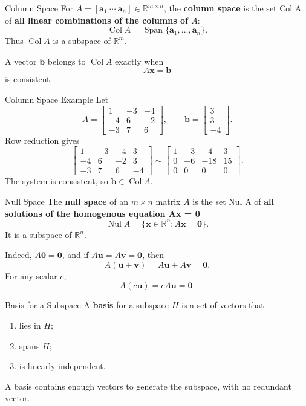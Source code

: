 \documentclass[aspectratio=169]{beamer}
\newcommand{\R}{\mathbb{R}}
\newcommand{\vect}[1]{\mathbf{#1}}
\newcommand{\Col}{\operatorname{Col}}
\newcommand{\Nul}{\operatorname{Nul}}
\newcommand{\Span}{\operatorname{Span}}
\begin{document}
\begin{frame}{Column Space}
For $A=[\vect a_1\ \cdots\ \vect a_n]\in\R^{m\times n}$, the \textbf{column space} is the set Col A of \textbf{all linear combinations of the columns of $A$}:
\[
\Col A=\Span\{\vect a_1,\ldots,\vect a_n\}.
\]
Thus $\Col A$ is a subspace of $\R^m$.
\pause

A vector $\vect b$ belongs to $\Col A$ exactly when
\[
A\vect x=\vect b
\]
is consistent.
\end{frame}

\begin{frame}{Column Space Example}
Let
\[
A=\begin{bmatrix}1&-3&-4\\-4&6&-2\\-3&7&6\end{bmatrix},
\qquad
\vect b=\begin{bmatrix}3\\3\\-4\end{bmatrix}.
\]
Row reduction gives
\[
\left[\begin{array}{ccc|c}
1&-3&-4&3\\-4&6&-2&3\\-3&7&6&-4
\end{array}\right]
\sim
\left[\begin{array}{ccc|c}
1&-3&-4&3\\0&-6&-18&15\\0&0&0&0
\end{array}\right].
\]
The system is consistent, so $\boxed{\vect b\in\Col A}$.
\end{frame}

\begin{frame}{Null Space}
The \textbf{null space} of an $m\times n$ matrix $A$ is the set Nul A of \textbf{all solutions of the homogenous equation Ax = 0}
\[
\Nul A=\{\vect x\in\R^n:A\vect x=\vect0\}.
\]
It is a subspace of $\R^n$.
\pause

Indeed, $A\vect0=\vect0$, and if $A\vect u=A\vect v=\vect0$, then
\[
A(\vect u+\vect v)=A\vect u+A\vect v=\vect0.
\]
For any scalar $c$,
\[
A(c\vect u)=cA\vect u=\vect0.
\]
\end{frame}

\begin{frame}{Basis for a Subspace}
A \textbf{basis} for a subspace $H$ is a set of vectors that
\begin{enumerate}
  \item lies in $H$;
  \item spans $H$;
  \item is linearly independent.
\end{enumerate}
\pause

A basis contains enough vectors to generate the subspace, with no redundant vector.
\end{frame}
\end{document}
